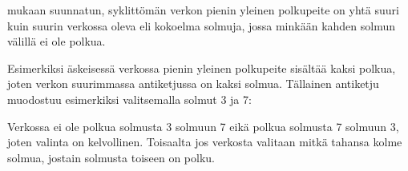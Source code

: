 
 mukaan suunnatun, syklittömän
verkon pienin yleinen polkupeite
on yhtä suuri kuin suurin verkossa oleva 
eli kokoelma solmuja,
jossa minkään kahden solmun välillä ei ole polkua.

Esimerkiksi äskeisessä verkossa pienin
yleinen polkupeite sisältää kaksi polkua,
joten verkon suurimmassa antiketjussa on kaksi solmua.
Tällainen antiketju muodostuu esimerkiksi
valitsemalla solmut 3 ja 7:

\begin{center}
\end{center}

Verkossa ei ole polkua solmusta 3 solmuun 7
eikä polkua solmusta 7 solmuun 3,
joten valinta on kelvollinen.
Toisaalta jos verkosta valitaan mitkä tahansa
kolme solmua, jostain solmusta toiseen on polku.